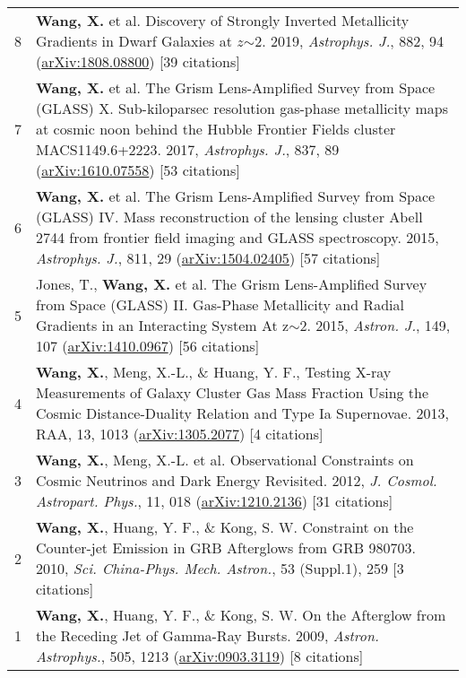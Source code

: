 \documentclass[letterpaper,10pt]{article}
\begin{document}
\begin{longtable}{rp{6.3in}}
8 &  \textbf{Wang, X.} et al. Discovery of Strongly Inverted Metallicity Gradients in Dwarf Galaxies at $z$$\sim$2. 2019, \textit{Astrophys. J.}, 882, 94 (\href{https://arxiv.org/abs/1808.08800}{arXiv:1808.08800}) [39 citations]  \\

7 &  \textbf{Wang, X.} et al. The Grism Lens-Amplified Survey from Space (GLASS) X. Sub-kiloparsec resolution gas-phase metallicity maps at cosmic noon behind the Hubble Frontier Fields cluster MACS1149.6+2223. 2017, \textit{Astrophys. J.}, 837, 89 (\href{http://arxiv.org/abs/1610.07558} {arXiv:1610.07558}) [53 citations]    \\

6 &  \textbf{Wang, X.} et al. The Grism Lens-Amplified Survey from Space (GLASS) IV. Mass reconstruction of the lensing cluster Abell 2744 from frontier field imaging and GLASS spectroscopy. 2015, \textit{Astrophys. J.}, 811, 29 (\href{http://arxiv.org/abs/1504.02405}{arXiv:1504.02405}) [57 citations] \\

5 &  Jones, T., \textbf{Wang, X.} et al. The Grism Lens-Amplified Survey from Space (GLASS) II. Gas-Phase Metallicity and Radial Gradients in an Interacting System At z$\sim$2. 2015, \textit{Astron. J.}, 149, 107 (\href{http://arxiv.org/abs/1410.0967}{arXiv:1410.0967}) [56 citations] \\

4 &  \textbf{Wang, X.}, Meng, X.-L., \& Huang, Y. F., Testing X-ray Measurements of Galaxy Cluster Gas Mass Fraction Using the Cosmic Distance-Duality Relation and Type Ia Supernovae. 2013, RAA, 13, 1013 (\href{http://arxiv.org/abs/1305.2077}{arXiv:1305.2077}) [4 citations] \\

3 &  \textbf{Wang, X.}, Meng, X.-L. et al. Observational Constraints on Cosmic Neutrinos and Dark Energy Revisited. 2012, \textit{J. Cosmol.  Astropart. Phys.}, 11, 018 (\href{http://arxiv.org/abs/1210.2136}{arXiv:1210.2136}) [31 citations] \\

2 &  \textbf{Wang, X.}, Huang, Y. F., \& Kong, S. W. Constraint on the Counter-jet Emission in GRB Afterglows from GRB 980703. 2010, \textit{Sci.  China-Phys. Mech. Astron.}, 53 (Suppl.1), 259 [3 citations]    \\

1 &  \textbf{Wang, X.}, Huang, Y. F., \& Kong, S. W. On the Afterglow from the Receding Jet of Gamma-Ray Bursts. 2009, \textit{Astron. Astrophys.}, 505, 1213 (\href{http://arxiv.org/abs/0903.3119}{arXiv:0903.3119}) [8 citations]   \\


\end{longtable}
\end{document}
